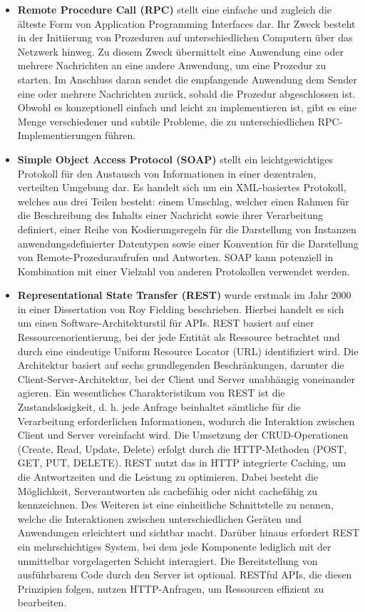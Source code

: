 \begin{itemize}

	\item \textbf{Remote Procedure Call (RPC)} stellt eine einfache und zugleich die älteste Form von Application Programming Interfaces dar. Ihr Zweck besteht in der Initiierung von Prozeduren auf unterschiedlichen Computern über das Netzwerk hinweg. Zu diesem Zweck übermittelt eine Anwendung eine oder mehrere Nachrichten an eine andere Anwendung, um eine Prozedur zu starten. Im Anschluss daran sendet die empfangende Anwendung dem Sender eine oder mehrere Nachrichten zurück, sobald die Prozedur abgeschlossen ist. Obwohl es konzeptionell einfach und leicht zu implementieren ist, gibt es eine Menge verschiedener und subtile Probleme, die zu unterschiedlichen RPC-Implementierungen führen.
	\citep{RPC}

	\item \textbf{Simple Object Access Protocol (SOAP)} stellt ein leichtgewichtiges Protokoll für den Austausch von Informationen in einer dezentralen, verteilten Umgebung dar. Es handelt sich um ein XML-basiertes Protokoll, welches aus drei Teilen besteht: einem Umschlag, welcher einen Rahmen für die Beschreibung des Inhalts einer Nachricht sowie ihrer Verarbeitung definiert, einer Reihe von Kodierungsregeln für die Darstellung von Instanzen anwendungsdefinierter Datentypen sowie einer Konvention für die Darstellung von Remote-Prozeduraufrufen und Antworten. SOAP kann potenziell in Kombination mit einer Vielzahl von anderen Protokollen verwendet werden.
	\citep{SOAP}

	\item \textbf{Representational State Transfer (REST)} wurde erstmals im Jahr 2000 in einer Dissertation von Roy Fielding beschrieben. Hierbei handelt es sich um einen Software-Architekturstil für APIs. REST basiert auf einer Ressourcenorientierung, bei der jede Entität als Ressource betrachtet und durch eine eindeutige Uniform Resource Locator (URL) identifiziert wird. Die Architektur basiert auf sechs grundlegenden Beschränkungen, darunter die Client-Server-Architektur, bei der Client und Server unabhängig voneinander agieren. Ein wesentliches Charakteristikum von REST ist die Zustandslosigkeit, d. h. jede Anfrage beinhaltet sämtliche für die Verarbeitung erforderlichen Informationen, wodurch die Interaktion zwischen Client und Server vereinfacht wird. Die Umsetzung der CRUD-Operationen (Create, Read, Update, Delete) erfolgt durch die HTTP-Methoden (POST, GET, PUT, DELETE). REST nutzt das in HTTP integrierte Caching, um die Antwortzeiten und die Leistung zu optimieren. Dabei besteht die Möglichkeit, Serverantworten als cachefähig oder nicht cachefähig zu kennzeichnen. Des Weiteren ist eine einheitliche Schnittstelle zu nennen, welche die Interaktionen zwischen unterschiedlichen Geräten und Anwendungen erleichtert und sichtbar macht. Darüber hinaus erfordert REST ein mehrschichtiges System, bei dem jede Komponente lediglich mit der unmittelbar vorgelagerten Schicht interagiert. Die Bereitstellung von ausführbarem Code durch den Server ist optional. RESTful APIs, die diesen Prinzipien folgen, nutzen HTTP-Anfragen, um Ressourcen effizient zu bearbeiten. \citep{Fielding2000}  \citep{graphqlreplacerest}


\end{itemize}
